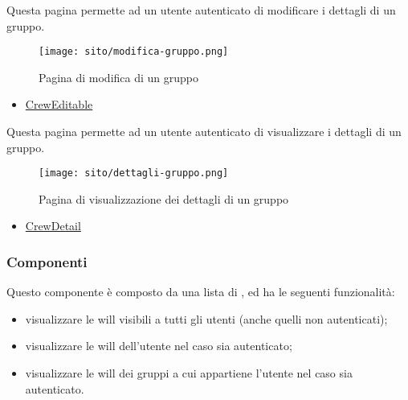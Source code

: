 Questa pagina permette ad un utente autenticato di modificare i dettagli di un
gruppo.
\begin{figure}[H]
    \centerline{\texttt{[image: sito/modifica-gruppo.png]}}
    \caption{Pagina di modifica di un gruppo}
\end{figure}
\begin{itemize}
    \item \hyperref[par:CrewEditable]{CrewEditable}
\end{itemize}

Questa pagina permette ad un utente autenticato di visualizzare i dettagli di
un gruppo.
\begin{figure}[H]
    \centerline{\texttt{[image: sito/dettagli-gruppo.png]}}
    \caption{Pagina di visualizzazione dei dettagli di un gruppo}
\end{figure}
\begin{itemize}
    \item \hyperref[par:CrewDetail]{CrewDetail}
\end{itemize}

\subsubsection{Componenti}
\label{par:HomepageComponent}
Questo componente è composto da una lista di , ed ha le
seguenti funzionalità:
\begin{itemize}
    \item visualizzare le \gls{will} visibili a tutti gli utenti (anche quelli
          non autenticati);
    \item visualizzare le \gls{will} dell'utente nel caso sia autenticato;
    \item visualizzare le \gls{will} dei gruppi a cui appartiene l'utente nel
          caso sia autenticato.
\end{itemize}

